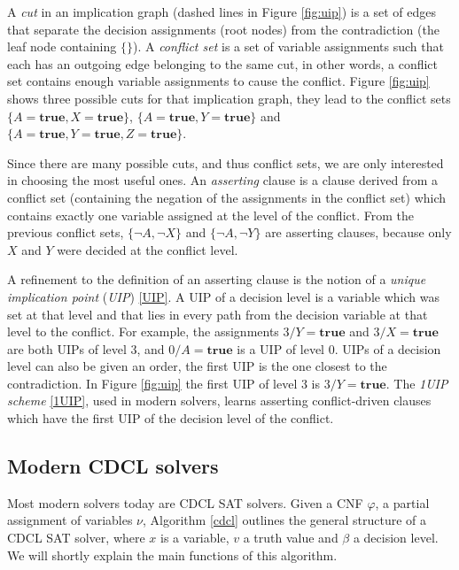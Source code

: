 \documentclass[12pt]{diicc}
\begin{document}
A \textit{cut} in an implication graph (dashed lines in Figure \ref{fig:uip}) is a set of edges that separate the decision assignments (root nodes) from the contradiction (the leaf node containing $\{\}$). A \textit{conflict set} is a set of variable assignments such that each has an outgoing edge belonging to the same cut, in other words, a conflict set contains enough variable assignments to cause the conflict. Figure \ref{fig:uip} shows three possible cuts for that implication graph, they lead to the conflict sets $\{A=\textbf{true},X=\textbf{true}\}$, $\{A=\textbf{true},Y=\textbf{true}\}$ and $\{A=\textbf{true},Y=\textbf{true},Z=\textbf{true}\}$.

Since there are many possible cuts, and thus conflict sets, we are only interested in choosing the most useful ones. An \textit{asserting} clause \cite{cdcl1} is a clause derived from a conflict set (containing the negation of the assignments in the conflict set) which contains exactly one variable assigned at the level of the conflict. From the previous conflict sets, $\{\neg A,\neg X\}$ and $\{\neg A,\neg Y\}$ are asserting clauses, because only $X$ and $Y$ were decided at the conflict level. 

A refinement to the definition of an asserting clause is the notion of a \textit{unique implication point} (\textit{UIP}) \ref{UIP}. A UIP of a decision level is a variable which was set at that level and that lies in every path from the decision variable at that level to the conflict. For example, the assignments $3/Y=\textbf{true}$ and $3/X=\textbf{true}$ are both UIPs of level 3, and $0/A=\textbf{true}$ is a UIP of level 0. UIPs of a decision level can also be given an order, the first UIP is the one closest to the contradiction. In Figure \ref{fig:uip} the first UIP of level 3 is $3/Y=\textbf{true}$. The \textit{1UIP scheme} \ref{1UIP}, used in modern solvers, learns asserting conflict-driven clauses which have the first UIP of the decision level of the conflict. 

\subsection{Modern CDCL solvers}

Most modern solvers today are CDCL SAT solvers. Given a CNF $\varphi$, a partial assignment of variables $\nu$, Algorithm \ref{cdcl} outlines the general structure of a CDCL SAT solver, where $x$ is a variable, $v$ a truth value and $\beta$ a decision level. We will shortly explain the main functions of this algorithm.
\end{document}
